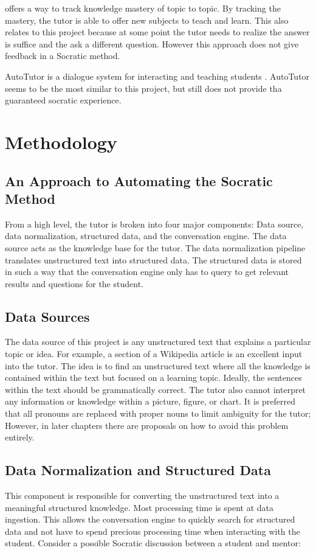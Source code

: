 \documentclass{sigchi}
\begin{document}
  \cite{chen} offers a way to track knowledge mastery of topic to topic. By tracking the mastery, the tutor is able to offer new subjects to teach and learn. This also relates to this project because at some point the tutor needs to realize the answer is suffice and the ask a different question. However this approach does not give feedback in a Socratic method.

  AutoTutor is a dialogue system for interacting and teaching students \cite{AutoTutor}. AutoTutor seems to be the most similar to this project, but still does not provide tha guaranteed socratic experience. 

  
  \section{Methodology}

  \subsection{An Approach to Automating the Socratic Method}

  From a high level, the tutor is broken into four major components: Data source, data normalization, structured data, and the conversation engine. The data source acts as the knowledge base for the tutor. The data normalization pipeline translates unstructured text into structured data. The structured data is stored in such a way that the conversation engine only has to query to get relevant results and questions for the student.

  \subsection{Data Sources}
  
  The data source of this project is any unstructured text that explains a particular topic or idea. For example, a section of a Wikipedia article is an excellent input into the tutor. The idea is to find an unstructured text where all the knowledge is contained within the text but focused on a learning topic. Ideally, the sentences within the text should be grammatically correct. The tutor also cannot interpret any information or knowledge within a picture, figure, or chart. It is preferred that all pronouns are replaced with proper nouns to limit ambiguity for the tutor; However, in later chapters there are proposals on how to avoid this problem entirely.

  \subsection{Data Normalization and Structured Data}
  This component is responsible for converting the unstructured text into a meaningful structured knowledge. Most processing time is spent at data ingestion. This allows the conversation engine to quickly search for structured data and not have to spend precious processing time when interacting with the student. Consider a possible Socratic discussion between a student and mentor:
\end{document}
